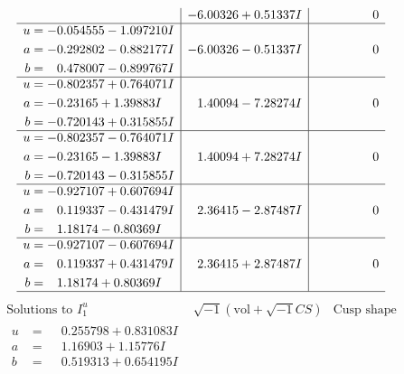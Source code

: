 \documentclass[1p]{elsarticle_modified}
\theoremstyle{definition}
\newcommand{\I}{\sqrt{-1}}
\begin{document}
$$\begin{array}{c|c|c}
 & -6.00326 + 0.51337 I & \phantom{-0.000000 } 0 \\ \hline\begin{aligned}
u &= -0.054555 - 1.097210 I \\
a &= -0.292802 - 0.882177 I \\
b &= \phantom{-}0.478007 - 0.899767 I\end{aligned}
 & -6.00326 - 0.51337 I & \phantom{-0.000000 } 0 \\ \hline\begin{aligned}
u &= -0.802357 + 0.764071 I \\
a &= -0.23165 + 1.39883 I \\
b &= -0.720143 + 0.315855 I\end{aligned}
 & \phantom{-}1.40094 - 7.28274 I & \phantom{-0.000000 } 0 \\ \hline\begin{aligned}
u &= -0.802357 - 0.764071 I \\
a &= -0.23165 - 1.39883 I \\
b &= -0.720143 - 0.315855 I\end{aligned}
 & \phantom{-}1.40094 + 7.28274 I & \phantom{-0.000000 } 0 \\ \hline\begin{aligned}
u &= -0.927107 + 0.607694 I \\
a &= \phantom{-}0.119337 - 0.431479 I \\
b &= \phantom{-}1.18174 - 0.80369 I\end{aligned}
 & \phantom{-}2.36415 - 2.87487 I & \phantom{-0.000000 } 0 \\ \hline\begin{aligned}
u &= -0.927107 - 0.607694 I \\
a &= \phantom{-}0.119337 + 0.431479 I \\
b &= \phantom{-}1.18174 + 0.80369 I\end{aligned}
 & \phantom{-}2.36415 + 2.87487 I & \phantom{-0.000000 } 0\\
 \hline 
 \end{array}$$\newpage$$\begin{array}{c|c|c}  
\text{Solutions to }I^u_{1}& \I (\text{vol} + \sqrt{-1}CS) & \text{Cusp shape}\\
 \hline 
\begin{aligned}
u &= \phantom{-}0.255798 + 0.831083 I \\
a &= \phantom{-}1.16903 + 1.15776 I \\
b &= \phantom{-}0.519313 + 0.654195 I\end{aligned}

\end{array}$$
\end{document}
